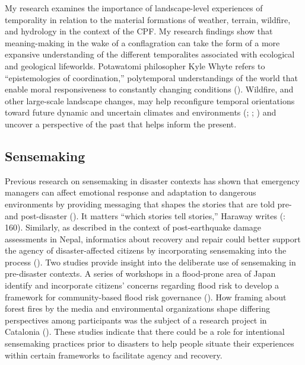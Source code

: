 \documentclass[
]{article}
\begin{document}
My research examines the importance of landscape-level experiences of temporality in relation to the material formations of weather, terrain, wildfire, and hydrology in the context of the CPF. My research findings show that meaning-making in the wake of a conflagration can take the form of a more expansive understanding of the different temporalites associated with ecological and geological lifeworlds. Potawatomi philosopher Kyle Whyte refers to ``epistemologies of coordination,'' polytemporal understandings of the world that enable moral responsiveness to constantly changing conditions (). Wildfire, and other large-scale landscape changes, may help reconfigure temporal orientations toward future dynamic and uncertain climates and environments (; ; ) and uncover a perspective of the past that helps inform the present.

\subsection{Sensemaking}\label{sensemaking}

Previous research on sensemaking in disaster contexts has shown that emergency managers can affect emotional response and adaptation to dangerous environments by providing messaging that shapes the stories that are told pre- and post-disaster (). It matters ``which stories tell stories,'' Haraway writes (: 160). Similarly, as described in the context of post-earthquake damage assessments in Nepal, informatics about recovery and repair could better support the agency of disaster-affected citizens by incorporating sensemaking into the process (). Two studies provide insight into the deliberate use of sensemaking in pre-disaster contexts. A series of workshops in a flood-prone area of Japan identify and incorporate citizens' concerns regarding flood risk to develop a framework for community-based flood risk governance (). How framing about forest fires by the media and environmental organizations shape differing perspectives among participants was the subject of a research project in Catalonia (). These studies indicate that there could be a role for intentional sensemaking practices prior to disasters to help people situate their experiences within certain frameworks to facilitate agency and recovery.
\end{document}
